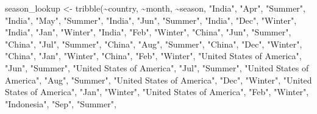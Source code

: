 \documentclass[
  letterpaper,
  DIV=11,
  numbers=noendperiod]{scrartcl}
\newenvironment{Shaded}{\begin{snugshade}}{\end{snugshade}}
\newcommand{\FunctionTok}[1]{\textcolor[rgb]{0.28,0.35,0.67}{#1}}
\newcommand{\NormalTok}[1]{\textcolor[rgb]{0.00,0.23,0.31}{#1}}
\newcommand{\OtherTok}[1]{\textcolor[rgb]{0.00,0.23,0.31}{#1}}
\newcommand{\SpecialCharTok}[1]{\textcolor[rgb]{0.37,0.37,0.37}{#1}}
\newcommand{\StringTok}[1]{\textcolor[rgb]{0.13,0.47,0.30}{#1}}
\begin{document}
\begin{Shaded}
\begin{Highlighting}[]
\NormalTok{season\_lookup }\OtherTok{\textless{}{-}} \FunctionTok{tribble}\NormalTok{(}\SpecialCharTok{\textasciitilde{}}\NormalTok{country, }\SpecialCharTok{\textasciitilde{}}\NormalTok{month, }\SpecialCharTok{\textasciitilde{}}\NormalTok{season,}
                         \StringTok{"India"}\NormalTok{, }\StringTok{"Apr"}\NormalTok{, }\StringTok{"Summer"}\NormalTok{,}
                         \StringTok{"India"}\NormalTok{, }\StringTok{"May"}\NormalTok{, }\StringTok{"Summer"}\NormalTok{,}
                         \StringTok{"India"}\NormalTok{, }\StringTok{"Jun"}\NormalTok{, }\StringTok{"Summer"}\NormalTok{,}
                         \StringTok{"India"}\NormalTok{, }\StringTok{"Dec"}\NormalTok{, }\StringTok{"Winter"}\NormalTok{,}
                         \StringTok{"India"}\NormalTok{, }\StringTok{"Jan"}\NormalTok{, }\StringTok{"Winter"}\NormalTok{,}
                         \StringTok{"India"}\NormalTok{, }\StringTok{"Feb"}\NormalTok{, }\StringTok{"Winter"}\NormalTok{,}
                         \StringTok{"China"}\NormalTok{, }\StringTok{"Jun"}\NormalTok{, }\StringTok{"Summer"}\NormalTok{,}
                         \StringTok{"China"}\NormalTok{, }\StringTok{"Jul"}\NormalTok{, }\StringTok{"Summer"}\NormalTok{,}
                         \StringTok{"China"}\NormalTok{, }\StringTok{"Aug"}\NormalTok{, }\StringTok{"Summer"}\NormalTok{,}
                         \StringTok{"China"}\NormalTok{, }\StringTok{"Dec"}\NormalTok{, }\StringTok{"Winter"}\NormalTok{,}
                         \StringTok{"China"}\NormalTok{, }\StringTok{"Jan"}\NormalTok{, }\StringTok{"Winter"}\NormalTok{,}
                         \StringTok{"China"}\NormalTok{, }\StringTok{"Feb"}\NormalTok{, }\StringTok{"Winter"}\NormalTok{,}
                         \StringTok{"United States of America"}\NormalTok{, }\StringTok{"Jun"}\NormalTok{, }\StringTok{"Summer"}\NormalTok{,}
                         \StringTok{"United States of America"}\NormalTok{, }\StringTok{"Jul"}\NormalTok{, }\StringTok{"Summer"}\NormalTok{,}
                         \StringTok{"United States of America"}\NormalTok{, }\StringTok{"Aug"}\NormalTok{, }\StringTok{"Summer"}\NormalTok{,}
                         \StringTok{"United States of America"}\NormalTok{, }\StringTok{"Dec"}\NormalTok{, }\StringTok{"Winter"}\NormalTok{,}
                         \StringTok{"United States of America"}\NormalTok{, }\StringTok{"Jan"}\NormalTok{, }\StringTok{"Winter"}\NormalTok{,}
                         \StringTok{"United States of America"}\NormalTok{, }\StringTok{"Feb"}\NormalTok{, }\StringTok{"Winter"}\NormalTok{,}
                         \StringTok{"Indonesia"}\NormalTok{, }\StringTok{"Sep"}\NormalTok{, }\StringTok{"Summer"}\NormalTok{,}

\end{Highlighting}
\end{Shaded}
\end{document}
